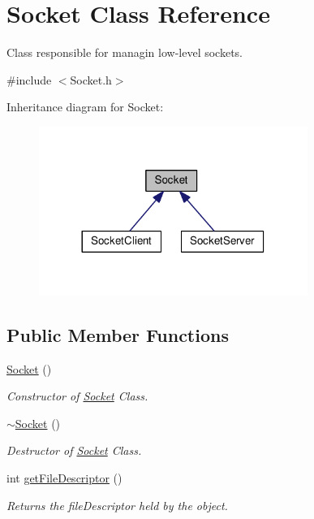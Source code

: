 \hypertarget{classSocket}{}\section{Socket Class Reference}
\label{classSocket}


Class responsible for managin low-\/level sockets.  




{\ttfamily \#include $<$Socket.\+h$>$}



Inheritance diagram for Socket\+:
\nopagebreak
\begin{figure}[H]
\begin{center}
\leavevmode
\includegraphics[width=248pt]{classSocket__inherit__graph}
\end{center}
\end{figure}
\subsection*{Public Member Functions}
\begin{DoxyCompactItemize}
\item 
\hyperlink{classSocket_a7c3256c4fc6e2c603df73201049fae5a}{Socket} ()
\begin{DoxyCompactList}\small\item\em Constructor of \hyperlink{classSocket}{Socket} Class. \end{DoxyCompactList}\item 
\hyperlink{classSocket_aeac4eb6379a543d38ed88977d3b6630a}{$\sim$\+Socket} ()
\begin{DoxyCompactList}\small\item\em Destructor of \hyperlink{classSocket}{Socket} Class. \end{DoxyCompactList}\item 
int \hyperlink{classSocket_ac4bde0cd12b53244b7c143d056b383ba}{get\+File\+Descriptor} ()
\begin{DoxyCompactList}\small\item\em Returns the file\+Descriptor held by the object. \end{DoxyCompactList}\end{DoxyCompactItemize}
